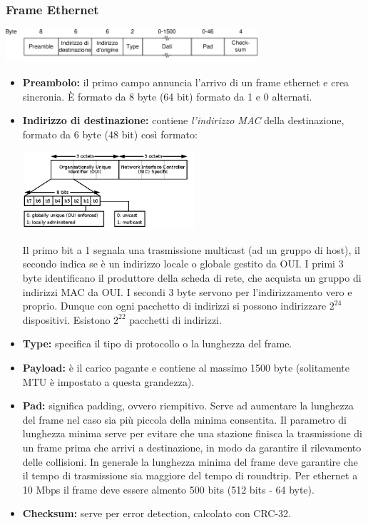 \documentclass[10pt,a4paper,twoside]{article}
\begin{document}
\subsubsection{Frame Ethernet}
\begin{center}
\includegraphics[width=0.7\textwidth]{images/frame_ethernet.png}
\end{center}
\begin{itemize}
\item \textbf{Preambolo:} il primo campo annuncia l'arrivo di un frame ethernet e crea sincronia. È formato da 8 byte (64 bit) formato da 1 e 0 alternati.
\item \textbf{Indirizzo di destinazione:} contiene \textit{l'indirizzo MAC} della destinazione, formato da 6 byte (48 bit) così formato:
\begin{center}
\includegraphics[width=0.5\textwidth]{images/indirizzo_MAC.png}
\end{center}
Il primo bit a 1 segnala una trasmissione multicast (ad un gruppo di host), il secondo indica se è un indirizzo locale o globale gestito da OUI. I primi 3 byte identificano il produttore della scheda di rete, che acquista un gruppo di indirizzi MAC da OUI. I secondi 3 byte servono per l'indirizzamento vero e proprio. Dunque con ogni pacchetto di indirizzi si possono indirizzare $2^{24}$ dispositivi. Esistono $2^{22}$ pacchetti di indirizzi.
\item \textbf{Type:} specifica il tipo di protocollo o la lunghezza del frame.
\item \textbf{Payload:} è il carico pagante e contiene al massimo 1500 byte (solitamente MTU è impostato a questa grandezza).
\item \textbf{Pad:} significa padding, ovvero riempitivo. Serve ad aumentare la lunghezza del frame nel caso sia più piccola della minima consentita. Il parametro di lunghezza minima serve per evitare che una stazione finisca la trasmissione di un frame prima che arrivi a destinazione, in modo da garantire il rilevamento delle collisioni. In generale la lunghezza minima del frame deve garantire che il tempo di trasmissione sia maggiore del tempo di roundtrip. Per ethernet a 10 Mbps il frame deve essere almento 500 bits (512 bits - 64 byte).
\item \textbf{Checksum:} serve per error detection, calcolato con CRC-32.
\end{itemize}
\end{document}
